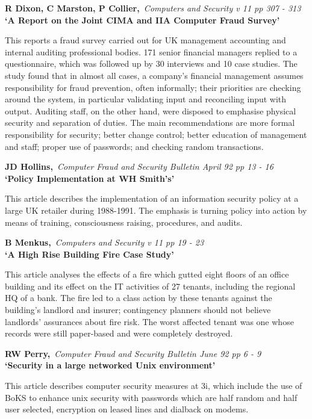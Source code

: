 {\bf \noindent R Dixon, C Marston, P Collier,}{\em ~Computers and Security 
v 11 pp 307 - 313\\}
{\bf `A Report on the Joint CIMA and IIA Computer Fraud Survey'}

This reports a fraud survey carried out for UK management accounting and
internal auditing professional bodies. 171 senior financial managers replied
to a questionnaire, which was followed up by 30 interviews and 10 case 
studies. The study found that in almost all cases, a company's financial
management assumes responsibility for fraud prevention, often informally;
their priorities are checking around the system, in particular validating
input and reconciling input with output. Auditing staff, on the other hand, 
were disposed to emphasise physical security and separation of duties. The
main recommendations are more formal responsibility for security; better 
change control; better education of management and staff; proper use of
passwords; and checking random transactions.

{\bf \noindent JD Hollins,}{\em ~Computer Fraud and Security Bulletin April 92
pp 13 - 16\\}
{\bf `Policy Implementation at WH Smith's'}

This article describes the implementation of an information security policy at
a large UK retailer during 1988-1991. The emphasis is turning policy into
action by means of training, consciousness raising, procedures, and audits.

\pagebreak

{\bf \noindent B Menkus,}{\em ~Computers and Security v 11 pp 19 - 23\\}
{\bf `A High Rise Building Fire Case Study'}

This article analyses the effects of a fire which gutted eight floors of an
office building and its effect on the IT activities of 27 tenants, including
the regional HQ of a bank. The fire led to a class action by these tenants 
against the building's landlord and insurer; contingency planners should not
believe landlords' assurances about fire risk. The worst affected tenant was
one whose records were still paper-based and were completely destroyed.

{\bf \noindent RW Perry,}{\em ~Computer Fraud and Security Bulletin June 92
pp 6 - 9\\}
{\bf `Security in a large networked Unix environment'}

This article describes computer security measures at 3i, which include the
use of BoKS to enhance unix security with passwords which are half random
and half user selected, encryption on leased lines and dialback on modems.

